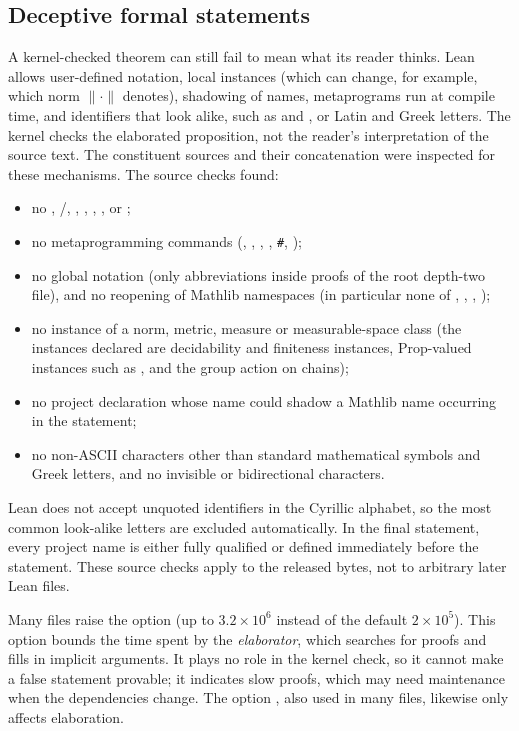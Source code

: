 \documentclass[11pt,a4paper]{article}
\newcommand{\leanhash}{\texttt{\#}}
\theoremstyle{definition}
\theoremstyle{remark}
\numberwithin{equation}{section}
\newcommand{\norm}[1]{\lVert #1\rVert}
\begin{document}
\subsection{Deceptive formal statements}\label{sec:formal-security}
A kernel-checked theorem can still fail to mean what its reader thinks. Lean allows user-defined notation, local instances (which can change, for example, which norm $\norm\cdot$ denotes), shadowing of names, metaprograms run at compile time, and identifiers that look alike, such as  and , or Latin and Greek letters. The kernel checks the elaborated proposition, not the reader's interpretation of the source text. The constituent sources and their concatenation were inspected for these mechanisms. The source checks found:
\begin{itemize}
\item no , /, , , , , or ;
\item no metaprogramming commands (, , , , \leanhash{}, );
\item no global notation (only  abbreviations inside proofs of the root depth-two file), and no reopening of Mathlib namespaces (in particular none of , , , );
\item no instance of a norm, metric, measure or measurable-space class (the instances declared are decidability and finiteness instances, Prop-valued instances such as , and the group action on chains);
\item no project declaration whose name could shadow a Mathlib name occurring in the statement;
\item no non-ASCII characters other than standard mathematical symbols and Greek letters, and no invisible or bidirectional characters.
\end{itemize}
Lean does not accept unquoted identifiers in the Cyrillic alphabet, so the most common look-alike letters are excluded automatically. In the final statement, every project name is either fully qualified or defined immediately before the statement. These source checks apply to the released bytes, not to arbitrary later Lean files.

Many files raise the option  (up to $3.2\times10^6$ instead of the default $2\times10^5$). This option bounds the time spent by the \emph{elaborator}, which searches for proofs and fills in implicit arguments. It plays no role in the kernel check, so it cannot make a false statement provable; it indicates slow proofs, which may need maintenance when the dependencies change. The option , also used in many files, likewise only affects elaboration.
\end{document}

